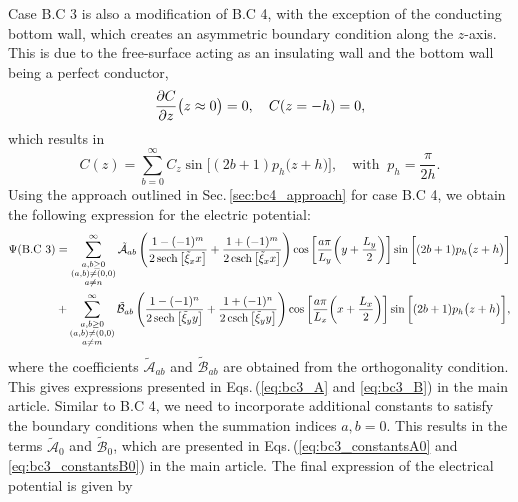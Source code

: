 \documentclass[aps,prfluids,reprint,superscriptaddress]{revtex4-2}
\newcommand{\ii}[1]{\text{#1}}
\newcommand{\nn}{\nonumber}
\numberwithin{equation}{section}
\begin{document}
Case B.C 3 is also a modification of B.C 4, with the exception of the conducting bottom wall, which creates an asymmetric boundary condition along the $z$-axis. This is due to the free-surface acting as an insulating wall and the bottom wall being a perfect conductor,
\begin{equation}
	\pdv{C}{z}\bigl(z\approx 0\bigr) = 0, \quad C(z=-h) = 0,
\end{equation}
which results in 
\begin{equation}
		C(z) = \sum_{b=0}^{\infty}
	C_{z} \sin{\biggl[(2b+1)p_h \bigl(z + h\bigr)\biggr]}, \quad \ii{with} \;\; p_h=\frac{\pi}{2h}.
\end{equation}
Using the approach outlined in Sec.\,\ref{sec:bc4_approach} for case B.C 4, we obtain the following expression for the electric potential:
\begin{align}
	\nn
	\Psi (\ii{B.C 3})&=
	\sum_{\substack{a, b \geq 0 \\ 
			(a,b)\neq (0,0) \\
			a\neq n}
	}^{\infty}
	\tilde{\mathcal{A}}_{ab}
	\left(
	\frac{1-(-1)^m}{2\sech{\bigl[\tilde\xi_x x \bigr]}} + \frac{1+(-1)^m}{2\csch{\bigl[\tilde\xi_x x \bigr]}}
	\right)
	\cos{\biggl[ \frac{a\pi}{L_y}\biggl(y + \frac{L_y}{2}\biggr)\biggr]}
	\sin{\biggl[ (2b+1)p_h\bigl(z + h\bigr)\biggr]} 
	\\
	&+
	\sum_{\substack{a, b \geq 0 \\ (a,b) 
			\neq (0,0)\\
			a\neq m		
	}}^{\infty}
	\tilde{\mathcal B}_{ab}
	\left(
	\frac{1-(-1)^n}{2\sech{\bigl[\tilde\xi_y y\bigr]}} + \frac{1+(-1)^n}{2\csch{\bigl[\tilde\xi_y y\bigr]}}
	\right)
	\cos{\biggl[ \frac{a\pi}{L_x}\biggl(x + \frac{L_x}{2}\biggr)\biggr]}
	\sin{\biggl[ (2b+1)p_h\bigl(z + h\bigr)\biggr]}
	,
\end{align}
where the coefficients $\tilde{\mathcal{A}}_{ab}$ and $\tilde{\mathcal{B}}_{ab}$ are obtained from the orthogonality condition. This gives expressions presented in Eqs.\,(\ref{eq:bc3_A} and \ref{eq:bc3_B}) in the main article. Similar to B.C 4, we need to incorporate additional constants to satisfy the boundary conditions when the summation indices $a,b=0$. This results in the terms $\tilde{\mathcal{A}}_{0}$ and $\tilde{\mathcal{B}}_{0}$, which are presented in Eqs.\,(\ref{eq:bc3_constantsA0} and \ref{eq:bc3_constantsB0}) in the main article. The final expression of the electrical potential is given by
\end{document}

